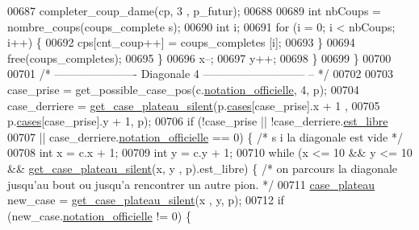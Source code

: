 \begin{DoxyCode}
00687                                                         completer\_coup\_dame(cp, 3
      , p\_futur);
00688 
00689                                         \textcolor{keywordtype}{int} nbCoups = nombre\_coups(coups\_complete
      s);
00690                                         \textcolor{keywordtype}{int} i;
00691                                         \textcolor{keywordflow}{for} (i = 0; i < nbCoups; i++) \{
00692                                                 cps[cnt\_coup++] = coups\_completes
      [i];
00693                                         \}
00694                                         free(coups\_completes);
00695                                 \}
00696                                 x--;
00697                                 y++;
00698                         \}
00699                 \}
00700 
00701                 \textcolor{comment}{/* ---------------------- Diagonale 4 ---------------------------
      -- */}
00702 
00703                 case\_prise = get\_possible\_case\_pos(c.\hyperlink{structcase__plateau_ad510581b324604a9cf685cbb769a421a}{notation_officielle}, 4, p);
00704                 case\_derriere = \hyperlink{plateau_8h_a60a8f706865d0ae9087f8d65d4667655}{get_case_plateau_silent}(p.\hyperlink{structplateau_a6afaa60f594542e0d742b0c6d3223392}{cases}[case\_prise].x + 1
      ,
00705                                 p.\hyperlink{structplateau_a6afaa60f594542e0d742b0c6d3223392}{cases}[case\_prise].y + 1, p);
00706                 \textcolor{keywordflow}{if} (!case\_prise || !case\_derriere.\hyperlink{structcase__plateau_a173f25d2fd7c653d77ca8174ba4f636d}{est_libre}
00707                                 || case\_derriere.\hyperlink{structcase__plateau_ad510581b324604a9cf685cbb769a421a}{notation_officielle} == 0) \{ \textcolor{comment}{/* s
      i la diagonale est vide */}
00708                         \textcolor{keywordtype}{int} x = c.x + 1;
00709                         \textcolor{keywordtype}{int} y = c.y + 1;
00710                         \textcolor{keywordflow}{while} (x <= 10 && y <= 10 && \hyperlink{plateau_8h_a60a8f706865d0ae9087f8d65d4667655}{get_case_plateau_silent}(x, y
      , p).est\_libre) \{ \textcolor{comment}{/* on parcours la diagonale jusqu'au bout ou jusqu'a rencontrer
       un autre pion. */}
00711                                 \hyperlink{structcase__plateau}{case_plateau} new\_case = \hyperlink{plateau_8h_a60a8f706865d0ae9087f8d65d4667655}{get_case_plateau_silent}(x
      , y, p);
00712                                 \textcolor{keywordflow}{if} (new\_case.\hyperlink{structcase__plateau_ad510581b324604a9cf685cbb769a421a}{notation_officielle} != 0) \{

\end{DoxyCode}

